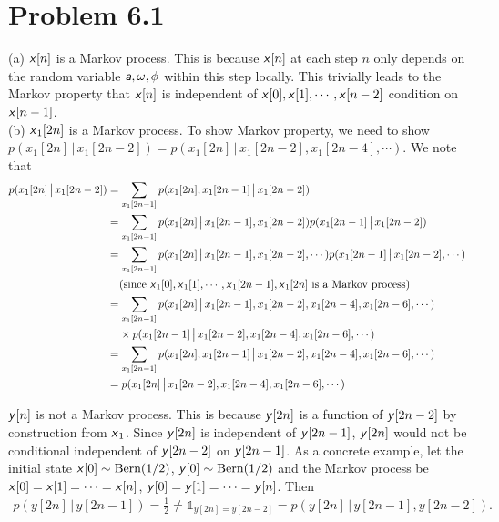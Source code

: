 \documentclass{article}
\newcommand{\s}[1]{\textsf{\textit{#1}}}
\newcommand{\qeds}{\hfill\qedsymbol}
\begin{document}
\section*{Problem 6.1}
%
(a) $\s{x}[n]$ is a Markov process. This is because $\s{x}[n]$ at each step
$n$ only depends on the random variable $\s{a}, \omega, \phi$ within
this step locally. This trivially leads to the Markov property that $\s{x}[n]$
is independent of $\s{x}[0], \s{x}[1], \cdots, \s{x}[n-2]$ condition on $\s{x}[n-1]$.
\\

\noindent
(b) $\s{x}_1[2n]$ is a Markov process. To show Markov property, we need to show
$p(x_1[2n] \,\big|\, x_1[2n - 2]) = p(x_1[2n] \,\big|\, x_1[2n - 2], x_1[2n -4], \cdots)$. We note that
\begin{align*}
p(x_1[2n] \,\big|\, x_1[2n - 2])	 &=
\sum_{x_1[2n - 1]} p(x_1[2n], x_1[2n-1] \,\big|\, x_1[2n - 2])\\
&= \sum_{x_1[2n - 1]} p(x_1[2n] \,\big|\, x_1[2n-1], x_1[2n-2])
p(x_1[2n-1] \,\big|\, x_1[2n-2])\\
&= \sum_{x_1[2n - 1]} p(x_1[2n] \,\big|\, x_1[2n-1], x_1[2n-2], \cdots)
p(x_1[2n-1] \,\big|\, x_1[2n-2], \cdots)\\
&\;\;\;\;\text{(since $\s{x}_1[0], \s{x}_1[1], \cdots, \s{x}_1[2n-1], \s{x}_1[2n]$ is a Markov process)}\\
&= \sum_{x_1[2n - 1]} p(x_1[2n] \,\big|\, x_1[2n-1], x_1[2n-2], x_1[2n-4], x_1[2n-6], \cdots)\\
&\;\;\;\; \times p(x_1[2n-1] \,\big|\, x_1[2n-2], x_1[2n-4], x_1[2n-6], \cdots)\\
&= \sum_{x_1[2n - 1]} p(x_1[2n], x_1[2n-1] \,\big|\, x_1[2n-2], x_1[2n-4], x_1[2n-6], \cdots)\\
& = p(x_1[2n] \,\big|\, x_1[2n-2], x_1[2n-4], x_1[2n-6], \cdots)
\end{align*} \qeds

$\s{y}[n]$ is not a Markov process. This is because $\s{y}[2n]$ is a function of
$\s{y}[2n-2]$ by construction from $\s{x}_1$. Since $\s{y}[2n]$ is independent of
$\s{y}[2n-1]$, $\s{y}[2n]$ would not be conditional independent of $\s{y}[2n-2]$ on
$\s{y}[2n-1]$. As a concrete example, let the initial state
$\s{x}[0] \sim \text{Bern}(1/2)$,
$\s{y}[0] \sim \text{Bern}(1/2)$ and the Markov process be
$\s{x}[0] = \s{x}[1] = \cdots = \s{x}[n]$, 
$\s{y}[0] = \s{y}[1] = \cdots = \s{y}[n]$. Then
\begin{align*}
	p(y[2n] \,\big|\, y[2n - 1]) = \frac{1}{2}
	\neq \mathds{1}_{y[2n] = y[2n - 2]} = p(y[2n] \,\big|\, y[2n - 1], y[2n - 2]).
\end{align*} \qeds
\pagebreak
\end{document}
